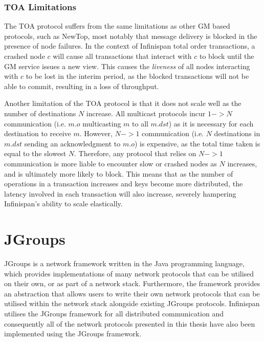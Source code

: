 	        \subsubsection*{TOA Limitations}
			The TOA protocol suffers from the same limitations as other GM based protocols, such as NewTop, most notably that message delivery is blocked in the presence of node failures.  In the context of Infinispan total order transactions, a crashed node $c$ will cause all transactions that interact with $c$ to block until the GM service issues a new view.  This causes the \emph{liveness} of all nodes interacting with $c$ to be lost in the interim period, as the blocked transactions will not be able to commit, resulting in a loss of throughput.  
	        
	        Another limitation of the TOA protocol is that it does not scale well as the number of destinations $N$ increase.  All multicast protocols incur $1->N$ communication (i.e. $m.o$ multicasting $m$ to all $m.dst$) as it is necessary for each destination to receive $m$.  However, $N->1$ communication (i.e. $N$ destinations in $m.dst$ sending an acknowledgment to $m.o$) is expensive, as the total time taken is equal to the slowest $N$.  Therefore, any protocol that relies on $N->1$ communication is more liable to encounter slow or crashed nodes as $N$ increases, and is ultimately more likely to block.  This means that as the number of operations in a transaction increases and keys become more distributed, the latency involved in each transaction will also increase, severely hampering Infinispan's ability to scale elastically.  
	        

\section{JGroups}
JGroups \citep{JGroups} is a network framework written in the Java programming language, which provides implementations of many network protocols that can be utilised on their own, or as part of a network stack.  Furthermore, the framework provides an abstraction that allows users to write their own network protocols that can be utilised within the network stack alongside existing JGroups protocols.  Infinispan utilises the JGroups framework for all distributed communication and consequently all of the network protocols presented in this thesis have also been implemented using the JGroups framework.  

